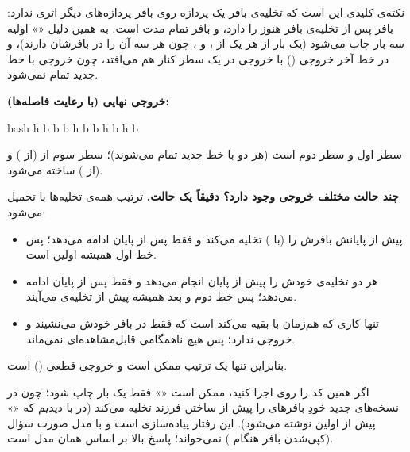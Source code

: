 نکته‌ی کلیدی این است که تخلیه‌ی بافر یک پردازه روی بافر پردازه‌های دیگر اثری ندارد: بافر  پس از تخلیه‌ی بافر  هنوز  را دارد، و بافر  تمام مدت  است. به همین دلیل «» اولیه سه بار چاپ می‌شود (یک بار از هر یک از ،  و ، چون هر سه آن را در بافرشان دارند)، و در خط آخر خروجی  () با خروجی  در یک سطر کنار هم می‌افتد، چون خروجی  با خط جدید تمام نمی‌شود.

\textbf{خروجی نهایی (با رعایت فاصله‌ها):}
\begin{codebox}[title=output]{bash}
h b b b
h b b h
b h b
\end{codebox}
سطر اول  و سطر دوم  است (هر دو با خط جدید تمام می‌شوند)؛ سطر سوم از  (از ) و  (از ) ساخته می‌شود.

\textbf{چند حالت مختلف خروجی وجود دارد؟ دقیقاً یک حالت.} ترتیب همه‌ی تخلیه‌ها با  تحمیل می‌شود:
\begin{itemize}
  \item {} پیش از پایانش بافرش را (با ) تخلیه می‌کند و  فقط پس از پایان  ادامه می‌دهد؛ پس خط اول همیشه اولین است.
  \item {} هر دو تخلیه‌ی خودش را پیش از پایان انجام می‌دهد و  فقط پس از پایان  ادامه می‌دهد؛ پس خط دوم و بعد  همیشه پیش از تخلیه‌ی  می‌آیند.
  \item تنها کاری که  هم‌زمان با بقیه می‌کند  است که فقط در بافر خودش می‌نشیند و خروجی ندارد؛ پس هیچ ناهمگامی قابل‌مشاهده‌ای نمی‌ماند.
\end{itemize}
بنابراین تنها یک ترتیب ممکن است و خروجی قطعی () است.

\begin{notebox}
اگر همین کد را روی  اجرا کنید، ممکن است «» فقط یک بار چاپ شود؛ چون در نسخه‌های جدید  خودِ  بافرهای  را پیش از ساختن فرزند تخلیه می‌کند (در  با  دیدیم که «» پیش از اولین  نوشته می‌شود). این رفتار پیاده‌سازی است و با مدل صورت سؤال (کپی‌شدن بافر هنگام ) نمی‌خواند؛ پاسخ بالا بر اساس همان مدل است.
\end{notebox}
